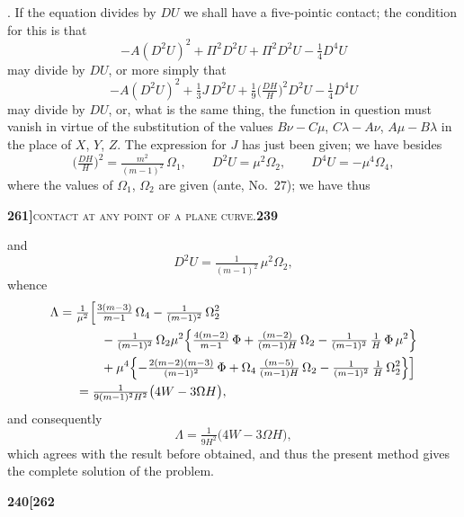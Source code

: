 \documentclass[11pt]{article}
\begin{document}
\medskip

. If the equation divides by $DU$ we shall have a five-pointic contact; the condition for this is that
\[
  -A(D^2 U)^2 + \Pi^2 D^2 U + \Pi^2 D^2 U - \tfrac{1}{4} D^4 U
\]
may divide by $DU$, or more simply that
\[
  -A(D^2 U)^2 + \tfrac{1}{3} J\,D^2 U + \tfrac{1}{9}\bigl(\tfrac{DH}{H}\bigr)^2 D^2 U - \tfrac{1}{4} D^4 U
\]
may divide by $DU$, or, what is the same thing, the function in question must vanish in virtue of the substitution of the values $B\nu - C\mu$, $C\lambda - A\nu$, $A\mu - B\lambda$ in the place of $X$, $Y$, $Z$. The expression for $J$ has just been given; we have besides
\[
  \bigl(\tfrac{DH}{H}\bigr)^2 = \tfrac{m^2}{(m-1)^2}\,\Omega_1, \qquad D^2 U = \mu^2 \Omega_2, \qquad D^4 U = -\mu^4 \Omega_4,
\]
where the values of $\Omega_1$, $\Omega_2$ are given (ante, No.~27); we have thus

\newpage
\noindent\textbf{261]}\hfill\textsc{contact at any point of a plane curve.}\hfill\textbf{239}

\medskip
and
\[
  D^2 U = \tfrac{1}{(m-1)^2}\,\mu^2 \Omega_2,
\]
whence
\[
\begin{aligned}
  \Lambda ={}& \tfrac{1}{\mu^2}\Bigl[\tfrac{3(m-3)}{m-1}\,\Omega_4 - \tfrac{1}{(m-1)^2}\,\Omega_2^2\\
            &\qquad - \tfrac{1}{(m-1)^2}\,\Omega_2 \mu^2\Bigl\{\tfrac{4(m-2)}{m-1}\,\Phi + \tfrac{(m-2)}{(m-1) H}\,\Omega_2 - \tfrac{1}{(m-1)^2}\,\tfrac{1}{H}\,\Phi\,\mu^2\Bigr\}\\
            &\qquad + \mu^4\Bigl\{-\tfrac{2(m-2)(m-3)}{(m-1)^2}\,\Phi + \Omega_4\,\tfrac{(m-5)}{(m-1) H}\,\Omega_2 - \tfrac{1}{(m-1)^2}\,\tfrac{1}{H}\,\Omega_2^2\Bigr\}\Bigr]\\
            &= \tfrac{1}{9(m-1)^2 H^2}\bigl(4 W - 3 \Omega H\bigr),
\end{aligned}
\]
and consequently
\[
  \Lambda = \tfrac{1}{9 H^2}\bigl(4 W - 3 \Omega H\bigr),
\]
which agrees with the result before obtained, and thus the present method gives the complete solution of the problem.

\bigskip


\newpage
\noindent\textbf{240}\hfill\textbf{[262}
\end{document}
